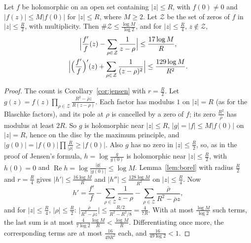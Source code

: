 \begin{lemma}\label{lem:localzeros}
Let $f$ be holomorphic on an open set containing $|z|\le R$, with $f(0)\ne0$ and $|f(z)|\le M|f(0)|$ for $|z|\le R$, where $M\ge2$. Let $\mathcal Z$ be the set of zeros of $f$ in $|z|\le\frac R2$,
with multiplicity. Then $\#\mathcal Z\le\frac{\log M}{\log2}$, and for $|z|\le\frac R4$, $z\notin\mathcal Z$,
\[
\begin{gathered}\Bigl|\frac{f'}f(z)-\sum_{\rho\in\mathcal Z}\frac1{z-\rho}\Bigr|\le\frac{17\log M}R,\\\Bigl|\Bigl(\frac{f'}f\Bigr)'(z)+\sum_{\rho\in\mathcal Z}\frac1{(z-\rho)^2}\Bigr|\le\frac{129\log M}{R^2}.\end{gathered}
\]
\end{lemma}
\begin{proof}
The count is Corollary~\ref{cor:jensen} with $r=\frac R2$. Let $g(z)=f(z)\prod_{\rho\in\mathcal Z}\frac{R^2-\overline\rho z}{R(z-\rho)}$. Each factor has modulus $1$ on $|z|=R$ (as for the Blaschke factors), and its
pole at $\rho$ is cancelled by a zero of $f$; its zero $\frac{R^2}{\overline\rho}$ has modulus at least $2R$. So $g$ is holomorphic near $|z|\le R$, $|g|=|f|\le M|f(0)|$ on $|z|=R$, hence on the
disc by the maximum principle, and $|g(0)|=|f(0)|\prod\frac R{|\rho|}\ge|f(0)|$. Also $g$ has no zero in $|z|\le\frac R2$, so, as in the proof of Jensen's formula, $h=\log\frac g{g(0)}$ is
holomorphic near $|z|\le\frac R2$, with $h(0)=0$ and $\operatorname{Re}h=\log\frac{|g|}{|g(0)|}\le\log M$. Lemma~\ref{lem:borel} with radius $\frac R2$ and $r=\frac R4$ gives $|h'|\le\frac{16\log M}R$ and
$|h''|\le\frac{128\log M}{R^2}$ on $|z|\le\frac R4$. Now
\[
h'=\frac{f'}f-\sum_{\rho\in\mathcal Z}\frac1{z-\rho}-\sum_{\rho\in\mathcal Z}\frac{\overline\rho}{R^2-\overline\rho z},
\]
and for $|z|\le\frac R4$, $|\rho|\le\frac R2$: $\bigl|\frac{\overline\rho}{R^2-\overline\rho z}\bigr|\le\frac{R/2}{R^2-R^2/8}=\frac4{7R}$. With at most $\frac{\log M}{\log2}$ such terms, the last sum is at most
$\frac{4}{7\log2}\frac{\log M}R<\frac{\log M}R$. Differentiating once more, the corresponding terms are at most $\frac{16}{49R^2}$ each, and $\frac{16}{49\log2}<1$.
\end{proof}

